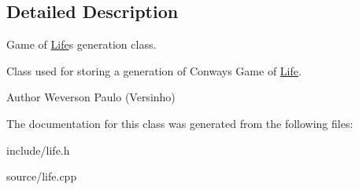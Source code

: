 \subsection{Detailed Description}
Game of \hyperlink{classLife}{Life}\textquotesingle{}s generation class. 

Class used for storing a generation of Conway\textquotesingle{}s Game of \hyperlink{classLife}{Life}. \begin{DoxyAuthor}{Author}
Weverson Paulo (Versinho) 
\end{DoxyAuthor}


The documentation for this class was generated from the following files\+:\begin{DoxyCompactItemize}
\item 
include/life.\+h\item 
source/life.\+cpp\end{DoxyCompactItemize}
